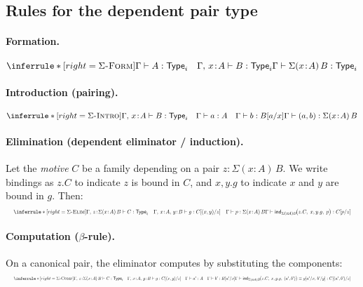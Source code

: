 \documentclass{article}
\newcommand{\Type}{\ensuremath{\mathsf{Type}}}
\newcommand{\judg}[3]{#1 \vdash #2 : #3}   %
\newcommand{\jdeq}{\equiv}                 %
\newcommand{\teq}[4]{#1 \vdash #2 \jdeq #3 : #4} %
\newcommand{\rulename}[1]{\textsc{#1}}
\begin{document}
\subsection*{Rules for the dependent pair type}

\paragraph{Formation.}
\[
\inferrule*[right=\rulename{$\Sigma$-Form}]{
  \judg{\Gamma}{A}{\Type_i}
  \quad
  \judg{\Gamma,\,x\!:\!A}{B}{\Type_i}
}{
  \judg{\Gamma}{\Sigma(x\!:\!A)\,B}{\Type_i}
}
\]

\paragraph{Introduction (pairing).}
\[
\inferrule*[right=\rulename{$\Sigma$-Intro}]{
  \judg{\Gamma,\,x\!:\!A}{B}{\Type_i}
  \quad
  \judg{\Gamma}{a}{A}
  \quad
  \judg{\Gamma}{b}{B[a/x]}
}{
  \judg{\Gamma}{(a,b)}{\Sigma(x\!:\!A)\,B}
}
\]

\paragraph{Elimination (dependent eliminator / induction).}
Let the \emph{motive} \(C\) be a family depending on a pair \(z:\Sigma(x\!:\!A)\,B\).
We write bindings as \(z.C\) to indicate \(z\) is bound in \(C\), and \(x,y.g\) to
indicate \(x\) and \(y\) are bound in \(g\). Then:
\[
\resizebox{\linewidth}{!}{$
\inferrule*[right=\rulename{$\Sigma$-Elim}]{
  \judg{\Gamma,\,z\!:\!\Sigma(x\!:\!A)\,B}{C}{\Type_i}
  \quad
  \judg{\Gamma,\,x\!:\!A,\,y\!:\!B}{g}{C[(x,y)/z]}
  \quad
  \judg{\Gamma}{p}{\Sigma(x\!:\!A)\,B}
}{
  \judg{\Gamma}{
    \mathsf{ind}_{\Sigma(x\!:\!A)B}\!\big(z.C,\; x,y.g,\; p\big)
  }{C[p/z]}
}
$}
\]

\paragraph{Computation (\(\beta\)-rule).}
On a canonical pair, the eliminator computes by substituting the components:
\[
\resizebox{\linewidth}{!}{$
\inferrule*[right=\rulename{$\Sigma$-Comp}]{
  \judg{\Gamma,\,z\!:\!\Sigma(x\!:\!A)\,B}{C}{\Type_i}
  \quad
  \judg{\Gamma,\,x\!:\!A,\,y\!:\!B}{g}{C[(x,y)/z]}
  \quad
  \judg{\Gamma}{a'}{A}
  \quad
  \judg{\Gamma}{b'}{B[a'/x]}
}{
  \teq{\Gamma}{
    \mathsf{ind}_{\Sigma(x\!:\!A)B}\!\big(z.C,\; x,y.g,\; (a',b')\big)
  }{
    g[a'/x,\, b'/y]
  }{C[(a',b')/z]}
}
$}
\]
\end{document}
